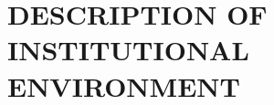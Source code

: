 \documentclass[../main.tex]{subfiles}
\begin{document}

\part{DESCRIPTION OF INSTITUTIONAL ENVIRONMENT}

\lipsum
\end{document}
